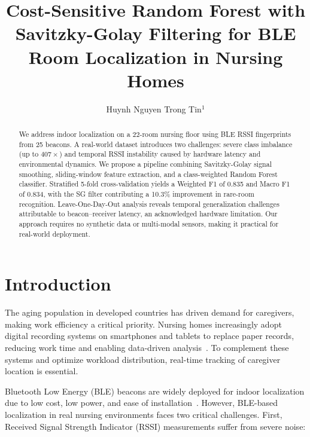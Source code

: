 \documentclass{iopconfser}
\begin{document}
\title{Cost-Sensitive Random Forest with Savitzky-Golay Filtering for BLE Room Localization in Nursing Homes}

\author{Huynh Nguyen Trong Tin$^{1}$}



\begin{abstract}
We address indoor localization on a 22-room nursing floor using BLE RSSI fingerprints from 25 beacons. A real-world dataset introduces two challenges: severe class imbalance (up to $407\times$) and temporal RSSI instability caused by hardware latency and environmental dynamics. We propose a pipeline combining Savitzky-Golay signal smoothing, sliding-window feature extraction, and a class-weighted Random Forest classifier. Stratified 5-fold cross-validation yields a Weighted F1 of 0.835 and Macro F1 of 0.834, with the SG filter contributing a 10.3\% improvement in rare-room recognition. Leave-One-Day-Out analysis reveals temporal generalization challenges attributable to beacon--receiver latency, an acknowledged hardware limitation. Our approach requires no synthetic data or multi-modal sensors, making it practical for real-world deployment.
\end{abstract}

\section{Introduction}

The aging population in developed countries has driven demand for caregivers, making work efficiency a critical priority. Nursing homes increasingly adopt digital recording systems on smartphones and tablets to replace paper records, reducing work time and enabling data-driven analysis~\cite{okuda2024}. To complement these systems and optimize workload distribution, real-time tracking of caregiver location is essential.

Bluetooth Low Energy (BLE) beacons are widely deployed for indoor localization due to low cost, low power, and ease of installation~\cite{faragher2015}. However, BLE-based localization in real nursing environments faces two critical challenges. First, Received Signal Strength Indicator (RSSI) measurements suffer from severe noise:
\end{document}

